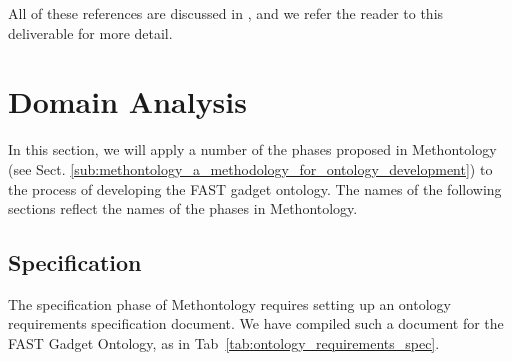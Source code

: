 \documentclass[twoside]{fast_latex}
\begin{document}
All of these references are discussed in \cite{urmetzer2010fast_state_of_the_art}, and we refer the reader to this deliverable for more detail.

\section{Domain Analysis} %
\label{sec:domain_analysis}

In this section, we will apply a number of the phases proposed in Methontology (see Sect. \ref{sub:methontology_a_methodology_for_ontology_development}) to the process of developing the FAST gadget ontology. The names of the following sections reflect the names of the phases in Methontology.

\subsection{Specification} %
\label{sub:specification}

The specification phase of Methontology requires setting up an ontology requirements specification document. We have compiled such a document for the FAST Gadget Ontology, as in Tab~\ref{tab:ontology_requirements_spec}.
\end{document}
